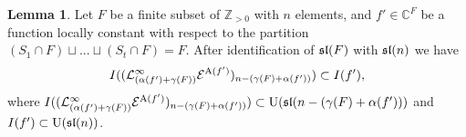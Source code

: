 \documentclass[10pt]{amsart}\oddsidemargin -1mm \evensidemargin -1mm \topmargin -15mm\headheight5mm \headsep 3.5mm \textheight 245mm\textwidth 170mm %
\theoremstyle{definition}\newtheorem{theorem}{Theorem}[section]\newtheorem{lemma}[theorem]{Lemma}\newtheorem{remark}[theorem]{Remark}\newtheorem{proposition}[theorem]{Proposition}\newtheorem{corollary}[theorem]{Corollary}\newtheorem{definition}[theorem]{Definition}\newtheorem{Ex}[theorem]{Example}
\begin{document}
\begin{lemma}\label{Lailf-f} Let $F$ be a finite subset of $\mathbb Z_{>0}$ with $n$ elements, and $f'\in\mathbb C^F$ be a function locally constant with respect to the partition $(S_1\cap F)\sqcup...\sqcup(S_t\cap F)=F$.
After identification of $\frak{sl}(F)$ with $\frak{sl}(n)$ we have
$$I((\mathcal L_{(\nint(f')+\gamma(F))}^\infty \mathcal E^{\wid(f')})_{n-(\gamma(F)+\nint(f'))})%
\subset I(f'),$$ where $I((\mathcal L_{(\operatorname{\alpha}(f')+\gamma(F))}^\infty \mathcal E^{\operatorname{A}(f')})_{n-(\gamma(F)+\operatorname{\alpha}(f'))})\subset \operatorname{\mathrm{U}}(\frak{sl}(n-(\gamma(F)+\operatorname{\alpha}(f')))$ and $I(f')\subset\operatorname{\mathrm{U}}(\frak{sl}(n))$.
\end{lemma}
\end{document}
